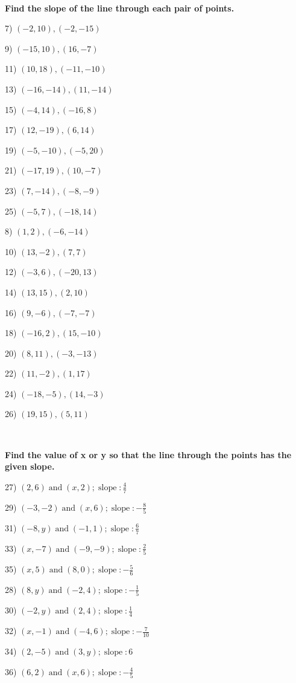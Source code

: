 \documentclass[11pt]{book}
\newcommand{\tmop}[1]{\ensuremath{\operatorname{#1}}}
\newcommand{\tmstrong}[1]{\textbf{#1}}
\theoremstyle{definition}  %
\begin{document}
\vspace{1in}
~

\pagebreak

{\tmstrong{Find the slope of the line through each pair of points.}}

\begin{multicols}{2}
  7) $(- 2, 10), (- 2, - 15)$
  
  9) $(- 15, 10), (16, - 7)$
  
  11) $(10, 18), (- 11, - 10)$
  
  13) $(- 16, - 14), (11, - 14)$
  
  15) $(- 4, 14), (- 16, 8)$
  
  17) $(12, - 19), (6, 14)$
  
  19) $(- 5, - 10), (- 5, 20)$
  
  21) $(- 17, 19), (10, - 7)$
  
  23) $(7, - 14), (- 8, - 9)$
  
  25) $(- 5, 7), (- 18, 14)$
  
  8) $(1, 2), (- 6, - 14)$
  
  10) $(13, - 2), (7, 7)$
  
  12) $(- 3, 6), (- 20, 13)$
  
  14) $(13, 15), (2, 10)$
  
  16) $(9, - 6), (- 7, - 7)$
  
  18) $(- 16, 2), (15, - 10)$
  
  20) $(8, 11), (- 3, - 13)$
  
  22) $(11, - 2), (1, 17)$
  
  24) $(- 18, - 5), (14, - 3)$
  
  26) $(19, 15), (5, 11)$
\end{multicols}

\

{\tmstrong{Find the value of x or y so that the line through the points has
the given slope.}}

\begin{multicols}{2}
  27) $(2, 6) \tmop{and} (x, 2) ; \tmop{slope} : \frac{4}{7}$
  
  29) $(- 3, - 2) \tmop{and} (x, 6) ; \tmop{slope} : - \frac{8}{5}$
  
  31) $(- 8, y) \tmop{and} (- 1, 1) ; \tmop{slope} : \frac{6}{7}$
  
  33) $(x, - 7) \tmop{and} (- 9, - 9) ; \tmop{slope} : \frac{2}{5}$
  
  35) $(x, 5) \tmop{and} (8, 0) ; \tmop{slope} : - \frac{5}{6}$
  
  28) $(8, y) \tmop{and} (- 2, 4) ; \tmop{slope} : - \frac{1}{5}$
  
  30) $(- 2, y) \tmop{and} (2, 4) ; \tmop{slope} : \frac{1}{4}$
  
  32) $(x, - 1) \tmop{and} (- 4, 6) ; \tmop{slope} : - \frac{7}{10}$
  
  34) $(2, - 5) \tmop{and} (3, y) ; \tmop{slope} : 6$
  
  36) $(6, 2) \tmop{and} (x, 6) ; \tmop{slope} : - \frac{4}{5}$
\end{multicols}
\end{document}
